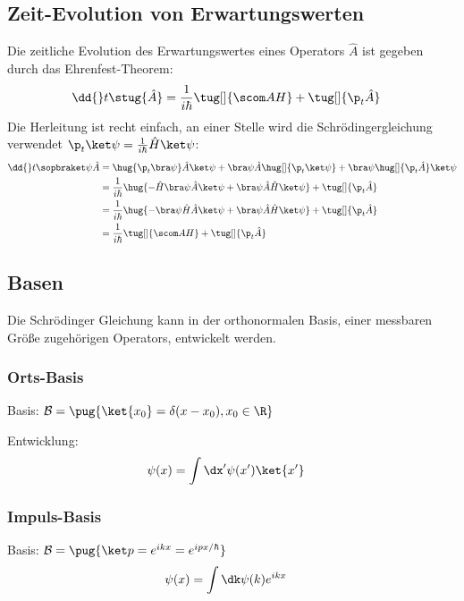 \documentclass[twocolumn, unnumberedsubsub]{summery_5.0} %
\begin{document}
\subsection{Zeit-Evolution von Erwartungswerten}
Die zeitliche Evolution des Erwartungswertes eines Operators \(\hat A\)
ist gegeben durch das Ehrenfest-Theorem:
\begin{align*}
    \dd{}t \stug {\hat A} &= \frac 1{i\hbar} \tug[]{\scom AH} + \tug[]{\p_t \hat A}
\end{align*}
Die Herleitung ist recht einfach, an einer Stelle wird die Schrödingergleichung verwendet \(\p_t \ket\psi = \frac1{i\hbar}\hat H \ket\psi\):
\begin{align*}
    \dd{}t \sopbraket \psi{\hat A} 
    &= \hug{\p_t \bra\psi}\hat A \ket \psi
    + \bra\psi\hat A \hug[]{\p_t\ket \psi}
    + \bra\psi \hug[]{\p_t \hat A} \ket \psi\\
    &= \frac{1}{i\hbar}\hug{
        -\hat H\bra\psi\hat A\ket\psi+ 
        \bra\psi\hat A \hat H \ket \psi}
    + \tug[]{\p_t \hat A}\\
    &= \frac{1}{i\hbar}\hug{- \bra\psi\hat H\hat A\ket\psi + \bra\psi\hat A \hat H \ket \psi} + \tug[]{\p_t \hat A}\\
    &= \frac{1}{i\hbar}\tug[]{\scom AH} + \tug[]{\p_t \hat A}
\end{align*}

\subsection{Basen}
Die Schrödinger Gleichung kann in der orthonormalen Basis, einer messbaren Größe zugehörigen Operators,
entwickelt werden.
\subsubsection{Orts-Basis}
Basis: \(\mathcal B = \pug{\ket{x_0} = \delta(x-x_0), x_0\in\R}\)

Entwicklung: 
\begin{align*}
    \psi(x) &= \int\dx' \psi(x') \ket{x'}
\end{align*}

\subsubsection{Impuls-Basis}
Basis: \(\mathcal B = \pug{\ket p = e^{ikx}= e^{i p x/\hbar}}\)
\begin{align*}
    \psi(x) &= \int \dk \psi(k) e^{ikx}
\end{align*}
\end{document}
